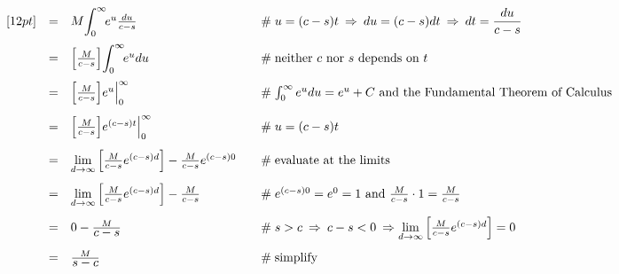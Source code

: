 \documentclass{article}
\theoremstyle{definition}
\begin{document}
\begin{equation*}
\begin{array}{lllll}
[12pt]                                                                                 %
&=&  M \mathlarger{\int}_0^\infty \! e^u \frac{du}{c-s}       &\quad  \mathrel{\#} u = (c-s)t  \: \Rightarrow \: du = (c-s) dt \: \Rightarrow \: dt = \dfrac{du}{c-s}                                                                       \\     
[12pt]                                                                                %
&=& \Big [ \frac{M}{c-s} \Big ] \mathlarger{\int}_0^\infty \! e^u du                                    &\quad  \mathrel{\#} \text{neither $c$ nor $s$ depends on $t$}                                                                            \\     
[12pt]                                                                                %
&=& \Big [ \frac{M}{c-s} \Big ] e^u \Big |_0^\infty              &\quad  \mathrel{\#} \int_0^\infty e^u du = e^u +C \text{ and the Fundamental Theorem of Calculus}                                                                \\     
[12pt]                                                                                %
&=& \Big [ \frac{M}{c-s} \Big ]  e^{(c-s)t} \Big |_0^\infty     &\quad  \mathrel{\#} u = (c-s)t                                                                                                                                                                              \\
[12pt]                                                                                %
&=& \lim\limits_{d \to \infty}\Big [\frac{M}{c-s} e^{(c-s)d} \Big ] - \frac{M}{c - s}e^{(c-s)0}  &\quad \mathrel{\#} \text{evaluate at the limits}                                                                                                   \\
[12pt]                                                                                %
&=& \lim\limits_{d \to \infty}\Big [\frac{M}{c-s} e^{(c-s)d} \Big ] - \frac{M}{c - s}                 &\quad  \mathrel{\#} e^{(c-s)0} = e^0 = 1 \text{ and } \frac{M}{c-s} \cdot 1 = \frac{M}{c-s}                                   \\
[12pt]                                                                                %
&=& 0 - \frac{M} {\mathlarger{c-s}}                                   &\quad  \mathrel{\#} s > c \: \Rightarrow \: c -s < 0 \: \Rightarrow  \lim\limits_{d \to \infty}\Big [\frac{M}{c-s} e^{(c-s)d} \Big ] = 0                        \\    
[12pt]                                                                                %
&=& \frac{M}{\mathlarger{s-c}}                                         &\quad  \mathrel{\#} \text{simplify} 
\end{array}
\end{equation*}
\end{document}

